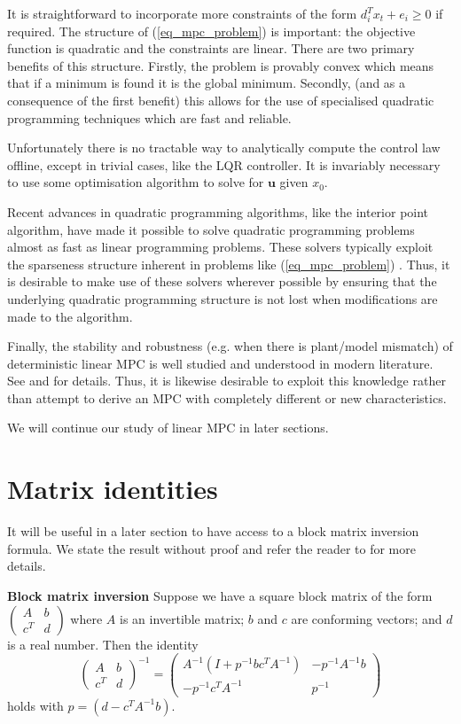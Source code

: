It is straightforward to incorporate more constraints of the form $d_i^Tx_t + e_i \geq 0$ if required. The structure of (\ref{eq_mpc_problem}) is important: the objective function is quadratic and the constraints are linear. There are two primary benefits of this structure. Firstly, the problem is provably convex which means that if a minimum is found it is the global minimum. Secondly, (and as a consequence of the first benefit) this allows for the use of specialised quadratic programming techniques which are fast and reliable.

Unfortunately there is no tractable way to analytically compute the control law offline, except in trivial cases, like the LQR controller. It is invariably necessary to use some optimisation algorithm to solve for $\mathbf{u}$ given $x_0$.

Recent advances in quadratic programming algorithms, like the interior point algorithm, have made it possible to solve quadratic programming problems almost as fast as linear programming problems. These solvers typically exploit the sparseness structure inherent in problems like (\ref{eq_mpc_problem}) \cite{mac}. Thus, it is desirable to make use of these solvers wherever possible by ensuring that the underlying quadratic programming structure is not lost when modifications are made to the algorithm.

Finally, the stability and robustness (e.g. when there is plant/model mismatch) of deterministic linear MPC is well studied and understood in modern literature. See \cite{raw} and \cite{mac} for details. Thus, it is likewise desirable to exploit this knowledge rather than attempt to derive an MPC with completely different or new characteristics.

We will continue our study of linear MPC in later sections.

\section{Matrix identities}
\label{sec_block}
It will be useful in a later section to have access to a block matrix inversion formula. We state the result without proof and refer the reader to \cite{jang} for more details.
\begin{thrm}
\textbf{Block matrix inversion} Suppose we have a square block matrix of the form $\begin{pmatrix}
A & b \\ c^T & d
\end{pmatrix}
$ where $A$ is an invertible matrix; $b$ and $c$ are conforming vectors; and $d$ is a real number. Then the identity
\begin{equation}
\begin{pmatrix}
A & b \\ c^T & d
\end{pmatrix}^{-1} = \begin{pmatrix}
A^{-1}(I+p^{-1}bc^TA^{-1}) & -p^{-1}A^{-1}b \\ -p^{-1}c^TA^{-1} & p^{-1}
\end{pmatrix}
\label{eq_block2}
\end{equation}
holds with $p = (d-c^TA^{-1}b)$.
\label{thrm_block_inv}
\end{thrm}